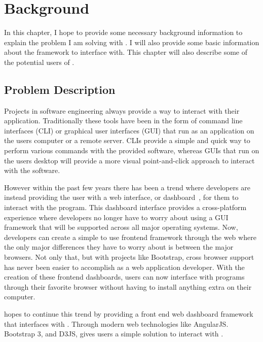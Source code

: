 
\cleardoublepage

\chapter{Background}
\label{makereference1}

In this chapter, I hope to provide some necessary background information to explain the problem I am solving with \projectName{}. I will also provide some basic information about the \ancor{} framework to interface with. This chapter will also describe some of the potential users of \projectName{}.

\section{Problem Description}
\label{makereference1.2}

Projects in software engineering always provide a way to interact with their application. Traditionally these tools have been in the form of command line interfaces (CLI) or graphical user interfaces (GUI) that run as an application on the users computer or a remote server. CLIs provide a simple and quick way to perform various commands with the provided software, whereas GUIs that run on the users desktop will provide a more visual point-and-click approach to interact with the software.

However within the past few years there has been a trend where developers are instead providing the user with a web interface, or dashboard~\cite{GEN:Few:2006}, for them to interact with the program. This dashboard interface provides a cross-platform experience where developers no longer have to worry about using a GUI framework that will be supported across all major operating systems. Now, developers can create a simple to use frontend framework through the web where the only major differences they have to worry about is between the major browsers. Not only that, but with projects like Bootstrap, cross browser support has never been easier to accomplish as a web application developer. With the creation of these frontend dashboards, users can now interface with programs through their favorite browser without having to install anything extra on their computer.

\projectName{} hopes to continue this trend by providing a front end web dashboard framework that interfaces with \ancor{}. Through modern web technologies like AngularJS. Bootstrap 3, and D3JS, \projectName{} gives users a simple solution to interact with \ancor{}.

